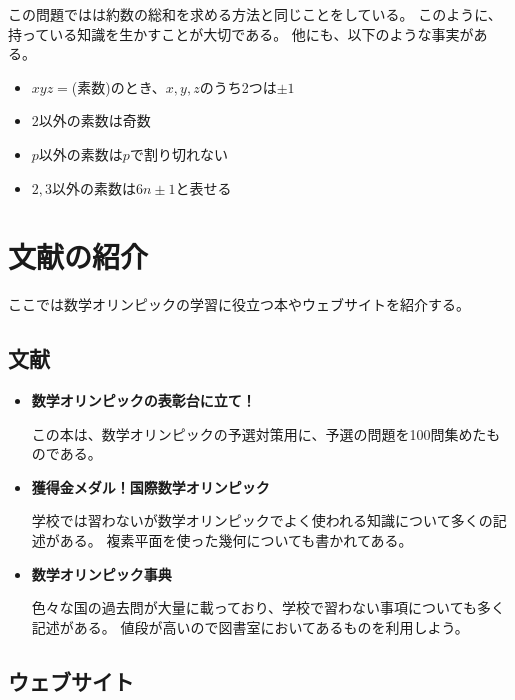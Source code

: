 \documentclass[uplatex,dvipdfmx]{jsbook}
\begin{document}
この問題ではは約数の総和を求める方法と同じことをしている。
このように、持っている知識を生かすことが大切である。
他にも、以下のような事実がある。
\begin{itemize}
    \item $xyz=$(素数)のとき、$x,y,z$のうち2つは$\pm 1$
    \item $2$以外の素数は奇数
    \item $p$以外の素数は$p$で割り切れない
    \item $2,3$以外の素数は$6n\pm 1$と表せる
\end{itemize}

\chapter{文献の紹介}

ここでは数学オリンピックの学習に役立つ本やウェブサイトを紹介する。

\section{文献}

\begin{itemize}
    \item \textbf{数学オリンピックの表彰台に立て！}

    この本は、数学オリンピックの予選対策用に、予選の問題を100問集めたものである。

    \item \textbf{獲得金メダル！国際数学オリンピック}

    学校では習わないが数学オリンピックでよく使われる知識について多くの記述がある。
    複素平面を使った幾何についても書かれてある。

    \item \textbf{数学オリンピック事典}

    色々な国の過去問が大量に載っており、学校で習わない事項についても多く記述がある。
    値段が高いので図書室においてあるものを利用しよう。
\end{itemize}

\section{ウェブサイト}
\end{document}
